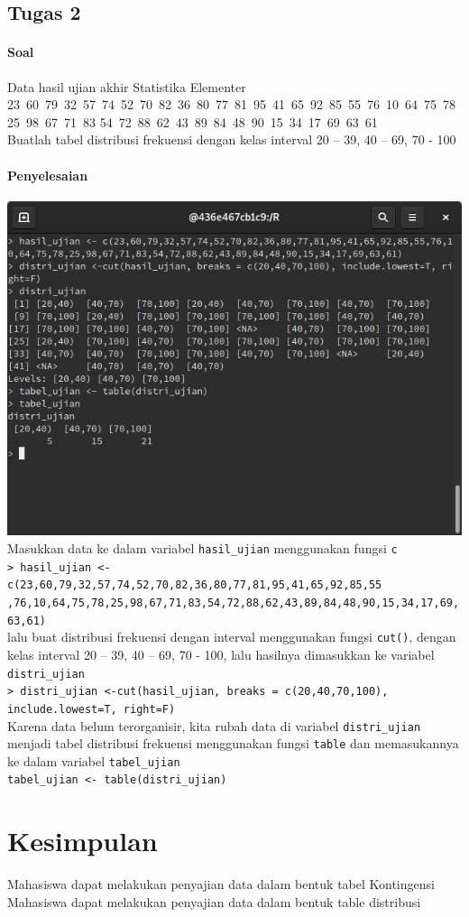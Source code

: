 \documentclass[a4paper,12pt]{article}
\begin{document}
\subsection{Tugas 2}
\paragraph{Soal\\}
Data hasil ujian akhir Statistika Elementer\\
23 60 79 32 57 74 52 70 82 36 80 77 81 95 41 65 92 85 55 76 10 64 75 78 25 98 67 71 83 54 72 88 62 43 89 84 48 90 15 34 17 69 63 61\\
Buatlah tabel distribusi frekuensi dengan kelas interval 20 – 39, 40 – 69, 70 - 100
\paragraph{Penyelesaian\\}
\includegraphics[width=\linewidth]{tugas2}
Masukkan data ke dalam variabel \texttt{hasil\_ujian} menggunakan fungsi \texttt{c}\\
\texttt{> hasil\_ujian <- c(23,60,79,32,57,74,52,70,82,36,80,77,81,95,41,65,92,85,55\\,76,10,64,75,78,25,98,67,71,83,54,72,88,62,43,89,84,48,90,15,34,17,69,63,61)}\\
lalu buat distribusi frekuensi dengan interval menggunakan fungsi \texttt{cut()}, dengan kelas interval 20 – 39, 40 – 69, 70 - 100, lalu hasilnya dimasukkan ke variabel \texttt{distri\_ujian}\\
\texttt{> distri\_ujian <-cut(hasil\_ujian, breaks = c(20,40,70,100), include.lowest=T, right=F)}\\
Karena data belum terorganisir, kita rubah data di variabel \texttt{distri\_ujian} menjadi tabel distribusi frekuensi menggunakan fungsi \texttt{table} dan memasukannya ke dalam variabel \texttt{tabel\_ujian}\\
\texttt{tabel\_ujian <- table(distri\_ujian)}

\newpage
\section{Kesimpulan}
Mahasiswa dapat melakukan penyajian data dalam bentuk tabel Kontingensi
Mahasiswa dapat melakukan penyajian data dalam bentuk table distribusi
\end{document}
